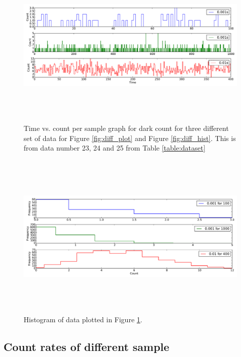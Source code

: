 \documentclass[a4paper,12pt]{article}
\begin{document}
\begin{figure}[H]
\centering
\includegraphics[angle=0,height=8cm,width=15.5cm]{graphs/dark_plots.pdf}
\caption{Time vs. count per sample graph for dark count  for three different set of data for Figure \ref{fig:diff_plot} and Figure \ref{fig:diff_hist}. This is from data number 23, 24 and 25 from Table \ref{table:dataset}}
\label{fig:dark_plot}
\end{figure}

\begin{figure}[H]
\centering
\includegraphics[angle=0,height=8cm,width=15.5cm]{graphs/dark_hist.pdf}
\caption{Histogram of data plotted in Figure \ref{fig:dark_plot}.}
\label{fig:dark_hist}
\end{figure}




\subsection{Count rates of different sample}
\label{sec:countrate}
\end{document}
